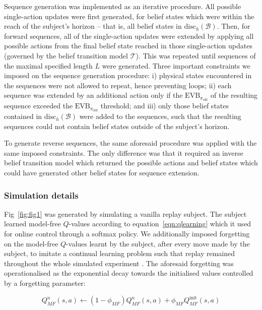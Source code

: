 Sequence generation was implemented as an iterative procedure. All possible single-action updates were first generated, for belief states which were within the reach of the subject's horizon -- that is, all belief states in $\text{disc}_h(\mathcal{B})$. Then, for forward sequences, all of the single-action updates were extended by applying all possible actions from the final belief state reached in those single-action updates (governed by the belief transition model $\mathcal{T}$). This was repeated until sequences of the maximal specified length $L$ were generated. Three important constraints we imposed on the sequence generation procedure: i) physical states encountered in the sequences were not allowed to repeat, hence preventing loops; ii) each sequence was extended by an additional action only if the $\text{EVB}_{\pi_{\text{old}}}$ of the resulting sequence exceeded the $\text{EVB}_{\pi_{\text{old}}}$ threshold; and iii) only those belief states contained in $\text{disc}_h(\mathcal{B})$ were added to the sequences, such that the resulting sequences could not contain belief states outside of the subject's horizon.

To generate reverse sequences, the same aforesaid procedure was applied with the same imposed constraints. The only difference was that it required an inverse belief transition model which returned the possible actions and belief states which could have generated other belief states for sequence extension. 

\subsubsection*{Simulation details}

Fig~\ref{fig:fig1} was generated by simulating a vanilla \textcite{mattarPrioritizedMemoryAccess2018} replay subject. The subject learned model-free $Q$-values according to equation~\ref{eqn:qlearning} which it used for online control through a softmax policy. We additionally imposed forgetting on the model-free $Q$-values learnt by the subject, after every move made by the subject, to imitate a continual learning problem such that replay remained throughout the whole simulated experiment \parencite{antonovOptimismPessimismOptimised2022}. The aforesaid forgetting was operationalised as the exponential decay towards the initialised values controlled by a forgetting parameter:

\begin{equation*}
    Q^n_{MF}(s, a) \leftarrow (1-\phi_{MF})Q^n_{MF}(s, a) + \phi_{MF}Q_{MF}^{\text{init}}(s, a)
\end{equation*}

